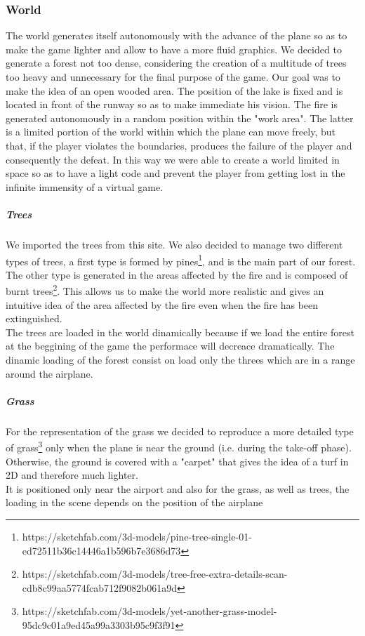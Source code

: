 \documentclass{article}
\begin{document}
\subsubsection*{World}
The world generates itself autonomously with the advance of the plane so as to make the game lighter and allow to have a more fluid graphics. We decided to generate a forest not too dense, considering the creation of a multitude of trees too heavy and unnecessary for the final purpose of the game. Our goal was to make the idea of an open wooded area. The position of the lake is fixed and is located in front of the runway so as to make immediate his vision. The fire is generated autonomously in a random position within the "work area". The latter is a limited portion of the world within which the plane can move freely, but that, if the player violates the boundaries, produces the failure of the player and consequently the defeat. In this way we were able to create a world limited in space so as to have a light code and prevent the player from getting lost in the infinite immensity of a virtual game.

\subparagraph*{Trees}
We imported the trees from this site. We also decided to manage two different types of trees, a first type is formed by pines\footnote{https://sketchfab.com/3d-models/pine-tree-single-01-ed72511b36c14446a1b596b7e3686d73}, and is the main part of our forest. The other type is generated in the areas affected by the fire and is composed of burnt trees\footnote{https://sketchfab.com/3d-models/tree-free-extra-details-scan-cdb8c99aa5774fcab712f9082b061a9d}. This allows us to make the world more realistic and gives an intuitive idea of the area affected by the fire even when the fire has been extinguished. \\
The trees are loaded in the world dinamically because if we load the entire forest at the beggining of the game the performace will decreace dramatically. The dinamic loading of the forest consist on load only the threes which are in a range around the airplane. 

\subparagraph*{Grass}
For the representation of the grass we decided to reproduce a more detailed type of grass\footnote{https://sketchfab.com/3d-models/yet-another-grass-model-95dc9c01a9ed45a99a3303b95c9f3f91} only when the plane is near the ground (i.e. during the take-off phase). Otherwise, the ground is covered with a "carpet" that gives the idea of a turf in 2D and therefore much lighter. \\
It is positioned only near the airport and also for the grass, as well as trees, the loading in the scene depends on the position of the airplane
\end{document}
